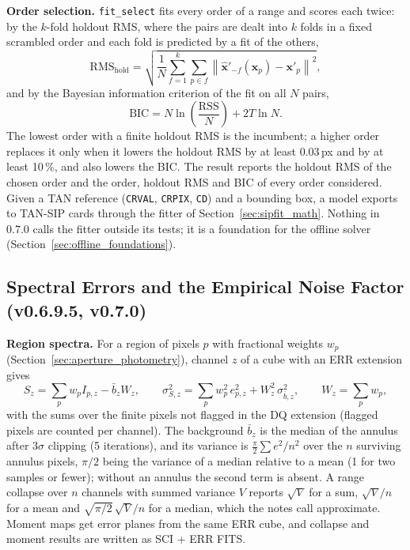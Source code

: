\documentclass[11pt,a4paper]{article}
\newcommand{\code}[1]{\texttt{\small #1}}
\begin{document}
    \textbf{Order selection.} \code{fit\_select} fits every order of a range and scores each twice: by the $k$-fold holdout RMS, where the pairs are dealt into $k$ folds in a fixed scrambled order and each fold is predicted by a fit of the others,
    \begin{equation}
        \text{RMS}_{\text{hold}} = \sqrt{\frac{1}{N} \sum_{f=1}^{k} \sum_{p \in f} \left\| \hat{\mathbf{x}}'_{-f}(\mathbf{x}_p) - \mathbf{x}'_p \right\|^2},
    \end{equation}
    and by the Bayesian information criterion of the fit on all $N$ pairs,
    \begin{equation}
        \text{BIC} = N \ln\!\left(\frac{\text{RSS}}{N}\right) + 2T \ln N .
    \end{equation}
    The lowest order with a finite holdout RMS is the incumbent; a higher order replaces it only when it lowers the holdout RMS by at least 0.03\,px and by at least 10\,\%, and also lowers the BIC. The result reports the holdout RMS of the chosen order and the order, holdout RMS and BIC of every order considered. Given a TAN reference (\code{CRVAL}, \code{CRPIX}, \code{CD}) and a bounding box, a model exports to TAN-SIP cards through the fitter of Section~\ref{sec:sipfit_math}. Nothing in 0.7.0 calls the fitter outside its tests; it is a foundation for the offline solver (Section~\ref{sec:offline_foundations}).

    \subsection{Spectral Errors and the Empirical Noise Factor (v0.6.9.5, v0.7.0)}
    \label{sec:lineerr_math}

    \textbf{Region spectra.} For a region of pixels $p$ with fractional weights $w_p$ (Section~\ref{sec:aperture_photometry}), channel $z$ of a cube with an ERR extension gives
    \begin{equation}
        S_z = \sum_{p} w_p I_{p,z} - \bar{b}_z W_z, \qquad
        \sigma_{S,z}^2 = \sum_{p} w_p^2\, e_{p,z}^2 + W_z^2\, \sigma_{\bar{b},z}^2, \qquad
        W_z = \sum_{p} w_p ,
    \end{equation}
    with the sums over the finite pixels not flagged in the DQ extension (flagged pixels are counted per channel). The background $\bar{b}_z$ is the median of the annulus after $3\sigma$ clipping (5 iterations), and its variance is $\tfrac{\pi}{2} \sum e^2 / n^2$ over the $n$ surviving annulus pixels, $\pi/2$ being the variance of a median relative to a mean (1 for two samples or fewer); without an annulus the second term is absent. A range collapse over $n$ channels with summed variance $V$ reports $\sqrt{V}$ for a sum, $\sqrt{V}/n$ for a mean and $\sqrt{\pi/2}\,\sqrt{V}/n$ for a median, which the notes call approximate. Moment maps get error planes from the same ERR cube, and collapse and moment results are written as SCI + ERR FITS.
\end{document}
